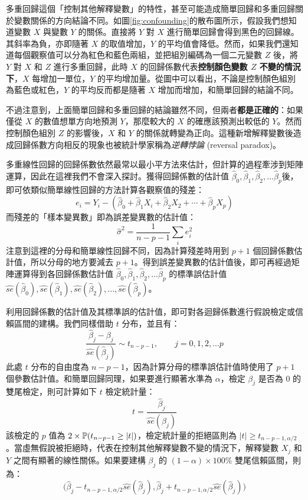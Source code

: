     多重回歸這個「控制其他解釋變數」的特性，甚至可能造成簡單回歸和多重回歸關於變數關係的方向結論不同。如圖\ref{fig:confounding}的散布圖所示，假設我們想知道變數 $X$ 與變數 $Y$ 的關係。直接將 $Y$ 對 $X$ 進行簡單回歸會得到黑色的回歸線。其斜率為負，亦即隨著 $X$ 的取值增加，$Y$ 的平均值會降低。然而，如果我們還知道每個觀察值可以分為紅色和藍色兩組，並把組別編碼為一個二元變數 $Z$ 後，將 $Y$ 對 $X$ 和 $Z$ 進行多重回歸，此時 $X$ 的回歸係數代表\textbf{控制顏色變數 $Z$ 不變的情況下}，$X$ 每增加一單位，$Y$ 的平均增加量。從圖中可以看出，不論是控制顏色組別為藍色或紅色，$Y$ 的平均反而都是隨著 $X$ 增加而增加，和簡單回歸的結論不同。
    
    不過注意到，上面簡單回歸和多重回歸的結論雖然不同，但兩者\textbf{都是正確的}：如果僅從 $X$ 的數值想單方向地預測 $Y$，那麼較大的 $X$ 的確應該預測出較低的 $Y$。然而控制顏色組別 $Z$ 的影響後，$X$ 和 $Y$ 的關係就轉變為正向。這種新增解釋變數後造成回歸係數方向相反的現象也被統計學家稱為\textit{逆轉悖論} (reversal paradox)。

    多重線性回歸的回歸係數依然最常以最小平方法來估計，但計算的過程牽涉到矩陣運算，因此在這裡我們不會深入探討。獲得回歸係數的估計值 $\hat{\beta}_0, \hat{\beta}_1, \hat{\beta}_2, ... \hat{\beta}_p$後，即可依類似簡單線性回歸的方法計算各觀察值的殘差：
    \[e_i = Y_i - (\hat{\beta}_0 + \hat{\beta}_1 X_i + \hat{\beta}_2 X_2 + \cdots + \hat{\beta}_p X_p)\]
    而殘差的「樣本變異數」即為誤差變異數的估計值：
    \[\hat{\sigma}^2 = \frac{1}{n-p-1}\sum_i e_i^2\]
    注意到這裡的分母和簡單線性回歸不同，因為計算殘差時用到 $p+1$ 個回歸係數估計值，所以分母的地方要減去 $p+1$。得到誤差變異數的估計值後，即可再經過矩陣運算得到各回歸係數估計值 $\hat{\beta}_0, \hat{\beta}_1, \hat{\beta}_2, ... \hat{\beta}_p$ 的標準誤估計值 $\widehat{se}(\hat{\beta}_0), \widehat{se}(\hat{\beta}_1), \widehat{se}(\hat{\beta}_2), ..., \widehat{se}(\hat{\beta}_p)$。

    利用回歸係數的估計值及其標準誤的估計值，即可對各迴歸係數進行假說檢定或信賴區間的建構。我們同樣借助 $t$ 分布，並且有：
    \[\frac{\hat{\beta}_j - \beta_j}{\widehat{se}(\hat{\beta}_j)} \sim t_{n-p-1}, \qquad j = 0,1,2,...p\]
    此處 $t$ 分布的自由度為 $n-p-1$，因為計算分母的標準誤估計值時使用了 $p+1$ 個參數估計值。和簡單回歸同理，如果要進行顯著水準為 $\alpha$，檢定 $\beta_j$ 是否為 $0$ 的雙尾檢定，則可計算如下 $t$ 檢定統計量：
    \[t = \frac{\hat{\beta}_j}{\widehat{se}(\hat{\beta}_j)}\]
    該檢定的 $p$ 值為 $2\times\mathbb{P}(t_{n-p-1} \ge |t|)$，檢定統計量的拒絕區則為 $|t| \ge t_{n-p-1, \alpha/2}$。當虛無假說被拒絕時，代表在控制其他解釋變數不變的情況下，解釋變數 $X_j$ 和 $Y$ 之間有顯著的線性關係。如果要建構 $\beta_j$ 的 $(1-\alpha)\times 100\%$ 雙尾信賴區間，則為：
    \[\Big(\hat{\beta}_j - t_{n-p-1, \alpha/2}\widehat{se}(\hat{\beta}_j), \hat{\beta}_j + t_{n-p-1, \alpha/2}\widehat{se}(\hat{\beta}_j)\Big)\]
    
